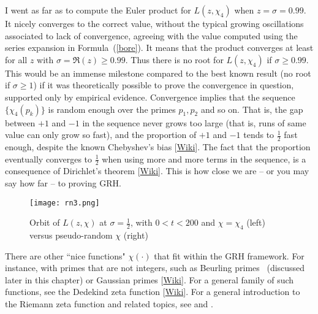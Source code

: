 \documentclass[oneside,10pt]{book}
\begin{document}
I went as far as to compute the Euler product for $L(z,\chi_4)$ when $z=\sigma=0.99$. It nicely converges to the correct value, without the typical
 growing oscillations associated to lack of convergence,
 agreeing with the value computed using the series expansion in Formula~(\ref{bore}). It means that the product converges at least for all $z$ with
 $\sigma=\Re(z)\geq 0.99$. Thus there is no root for $L(z,\chi_4)$ if $\sigma\geq 0.99$. This would be an immense milestone compared to the best known result (no root if $\sigma\geq 1$) if it was theoretically possible to prove the convergence in question, supported only by empirical evidence.
 Convergence implies that the sequence $\{\chi_4(p_k)\}$ is random enough over the primes $p_1,p_2$ and so on. That is, the gap between $+1$ and $-1$ in the sequence never grows too large (that is, runs of same value can only grow so fast), and the proportion of $+1$ and $-1$ tends to $\frac{1}{2}$ fast enough, despite the known \textcolor{index}{Chebyshev's bias} [\href{https://en.wikipedia.org/wiki/Chebyshev\%27s_bias}{Wiki}]. The fact that the proportion eventually converges to $\frac{1}{2}$ when using more and more terms in the sequence, is a consequence
 of \textcolor{index}{Dirichlet's theorem} [\href{https://en.wikipedia.org/wiki/Dirichlet\%27s_theorem_on_arithmetic_progressions}{Wiki}]. This is how close we are -- or you may say how far -- to proving GRH.

\begin{figure}[H]
\centering
\texttt{[image: rn3.png]}
\caption{Orbit of $L(z,\chi)$ at $\sigma=\frac{1}{2}$, with $0<t<200$ and $\chi=\chi_4$ (left) versus pseudo-random $\chi$ (right)}
\label{fig:rn2x}
\end{figure}

There are other ``nice functions" $\chi(\cdot)$ that fit within the GRH framework. For instance, with primes that are not integers, such as Beurling primes~\cite{bzf2004} (discussed later in this chapter) or \textcolor{index}{Gaussian primes} [\href{https://en.wikipedia.org/wiki/Gaussian_integer}{Wiki}]. For a general family of such functions, see the \textcolor{index}{Dedekind zeta function} [\href{https://en.wikipedia.org/wiki/Dedekind_zeta_function}{Wiki}]. For a general introduction to the Riemann zeta function and related topics, see \cite{kconrad2018} and \cite{tdr1987}.
\end{document}

